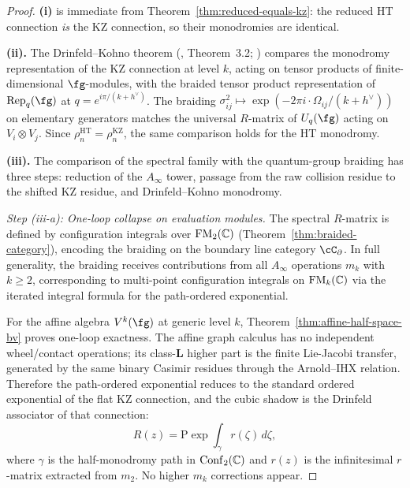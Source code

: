 \begin{proof}
\textbf{(i)} is immediate from Theorem~\ref{thm:reduced-equals-kz}: the reduced HT connection \emph{is} the KZ connection, so their monodromies are identical.

\medskip
\noindent\textbf{(ii).} The Drinfeld--Kohno theorem (\cite{Dri89}, Theorem~3.2; \cite{KL93}) compares the monodromy representation of the KZ connection at level $k$, acting on tensor products of finite-dimensional $\fg$-modules, with the braided tensor product representation of $\mathrm{Rep}_q(\fg)$ at $q = e^{i\pi/(k + h^\vee)}$. The braiding $\sigma_{ij}^2 \mapsto \exp(-2\pi i \cdot \Omega_{ij}/(k + h^\vee))$ on elementary generators matches the universal $R$-matrix of $U_q(\fg)$ acting on $V_i \otimes V_j$. Since $\rho_n^{\mathrm{HT}} = \rho_n^{\mathrm{KZ}}$, the same comparison holds for the HT monodromy.

\medskip
\noindent\textbf{(iii).} The comparison of the spectral family with
the quantum-group braiding has three steps: reduction of the
$A_\infty$ tower, passage from the raw collision residue to the
shifted KZ residue, and Drinfeld--Kohno monodromy.

\smallskip\noindent
\emph{Step (iii-a): One-loop collapse on evaluation modules.}
The spectral $R$-matrix is defined by configuration integrals
over $\mathrm{FM}_2(\mathbb C)$ (Theorem~\ref{thm:braided-category}),
encoding the braiding on the boundary line category
$\cC_\partial$. In full generality, the braiding receives
contributions from all $A_\infty$ operations $m_k$ with
$k \geq 2$, corresponding to multi-point configuration
integrals on $\mathrm{FM}_k(\mathbb C)$ via the iterated integral formula
for the path-ordered exponential.

For the affine algebra $V^k(\fg)$ at generic level $k$,
Theorem~\ref{thm:affine-half-space-bv} proves one-loop
exactness. The affine graph calculus has no independent
wheel/contact operations; its class-$\mathbf L$ higher part is the
finite Lie-Jacobi transfer, generated by the same binary Casimir
residues through the Arnold--IHX relation. Therefore the
path-ordered exponential reduces to the standard ordered
exponential of the flat KZ connection, and the cubic shadow is the
Drinfeld associator of that connection:
\[
 R(z) = \mathrm{P}\!\exp\!\int_\gamma r(\zeta)\, d\zeta,
\]
where $\gamma$ is the half-monodromy path in $\mathrm{Conf}_2(\mathbb C)$
and $r(z)$ is the infinitesimal $r$-matrix extracted from $m_2$.
No higher $m_k$ corrections appear.


\end{proof}
